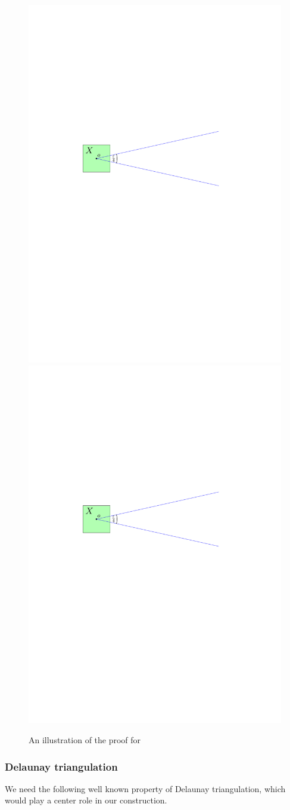 \documentclass[12pt]{article}%
\begin{document}
\begin{figure}[h]
    \phantom{}\hfill%
    \includegraphics[page=2, width=0.48\linewidth]{figs/double_wedge}%
    \hfill%
    \includegraphics[page=3, width=0.48\linewidth]{figs/double_wedge}%
    \hfill%
    \phantom{}%
	\caption{An illustration of the proof for }
\end{figure}


\subsubsection{Delaunay triangulation}

We need the following well known property of Delaunay triangulation,
which would play a center role in our construction.
\end{document}
